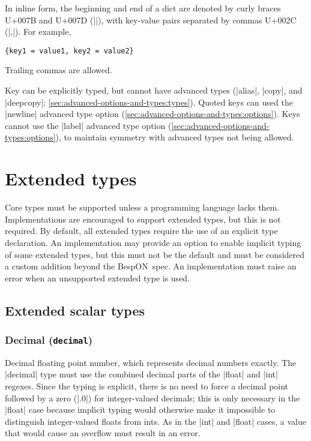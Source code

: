 \documentclass[11pt]{article}
\newcommand{\bespon}{BespON}
\begin{document}
In inline form, the beginning and end of a dict are denoted by curly braces U+007B and U+007D (|{}|), with key-value pairs separated by commas U+002C (|,|).  For example,
\begin{Verbatim}
{key1 = value1, key2 = value2}
\end{Verbatim}
Trailing commas are allowed.

Key can be explicitly typed, but cannot have advanced types (|alias|, |copy|, and |deepcopy|; \cref{sec:advanced-options-and-types:types}).  Quoted keys can used the |newline| advanced type option (\cref{sec:advanced-options-and-types:options}).  Keys cannot use the |label| advanced type option (\cref{sec:advanced-options-and-types:options}), to maintain symmetry with advanced types not being allowed.


\section{Extended types}

Core types must be supported unless a programming language lacks them.  Implementations are encouraged to support extended types, but this is not required.  By default, all extended types require the use of an explicit type declaration.  An implementation may provide an option to enable implicit typing of some extended types, but this must not be the default and must be considered a custom addition beyond the \bespon\ spec.  An implementation must raise an error when an unsupported extended type is used.


\subsection{Extended scalar types}

\subsubsection{Decimal (\texttt{decimal})}

Decimal floating point number, which represents decimal numbers exactly.  The |decimal| type must use the combined decimal parts of the |float| and |int| regexes.  Since the typing is explicit, there is no need to force a decimal point followed by a zero (|.0|) for integer-valued decimals; this is only necessary in the |float| case because implicit typing would otherwise make it impossible to distinguish integer-valued floats from ints.  As in the |int| and |float| cases, a value that would cause an overflow must result in an error.
\end{document}
